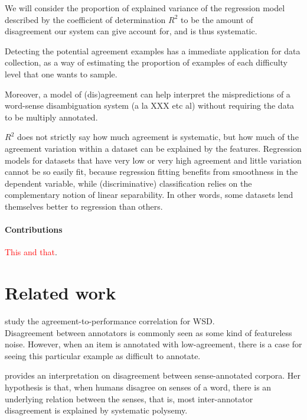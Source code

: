 \documentclass[11pt,a4paper]{article}
\begin{document}
We will consider the proportion of explained variance of the regression model described by the coefficient of determination $R^2$ to be the amount of disagreement our system can give account for, and is thus systematic. 

Detecting the potential agreement examples has a immediate application for data collection, as a way of estimating the proportion of examples of each difficulty level that one wants to sample. 

Moreover, a model of (dis)agreement can help interpret the mispredictions of a word-sense disambiguation system (a la XXX etc al) without requiring the data to be multiply annotated. 

$R^2$ does not strictly say how much agreement is systematic, but how much of the agreement variation within a dataset can be explained by the features. Regression models for datasets that have very low or very high agreement and little variation cannot be so easily fit, because regression fitting benefits from smoothness in the dependent variable, while (discriminative) classification relies on the complementary notion of linear separability. In other words, some datasets lend themselves better to regression than others.



\paragraph{Contributions} \textcolor{red}{This and that}.

\section{Related work}


\cite{Plank2014} 

\cite{Jurgens2014}

\cite{Passonneau2014}

\cite{Jurgens2013}

\cite{Lopez2015} study the agreement-to-performance correlation for WSD. \\

Disagreement between annotators is commonly seen as some kind of featureless noise. However, when an item is annotated with low-agreement, there is a case for seeing this particular example as difficult to annotate. 

\cite{Tomuro2001a} provides an interpretation on disagreement between sense-annotated corpora. Her hypothesis is that, when humans disagree on senses of a word, there is an underlying relation between the senses, that is, most inter-annotator disagreement is explained by systematic polysemy. 
\end{document}

